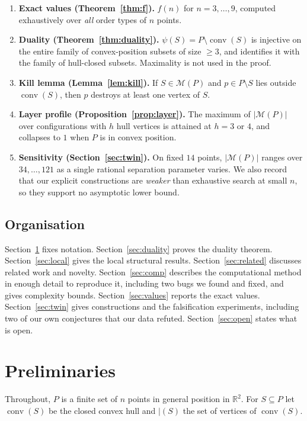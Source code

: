 \documentclass[11pt,a4paper]{article}
\theoremstyle{definition}
\newcommand{\conv}{\operatorname{conv}}
\newcommand{\M}{\mathcal{M}}
\begin{document}
\begin{enumerate}[leftmargin=*]
\item \textbf{Exact values (Theorem~\ref{thm:f}).} $f(n)$ for $n=3,\dots,9$,
  computed exhaustively over \emph{all} order types of $n$ points.
\item \textbf{Duality (Theorem~\ref{thm:duality}).} $\psi(S)=P\setminus\conv(S)$
  is injective on the entire family of convex-position subsets of size $\ge 3$,
  and identifies it with the family of hull-closed subsets.  Maximality is not
  used in the proof.
\item \textbf{Kill lemma (Lemma~\ref{lem:kill}).} If $S\in\M(P)$ and
  $p\in P\setminus S$ lies outside $\conv(S)$, then $p$ destroys at least one
  vertex of $S$.
\item \textbf{Layer profile (Proposition~\ref{prop:layer}).} The maximum of
  $|\M(P)|$ over configurations with $h$ hull vertices is attained at $h=3$ or
  $4$, and collapses to $1$ when $P$ is in convex position.
\item \textbf{Sensitivity (Section~\ref{sec:twin}).} On fixed $14$ points,
  $|\M(P)|$ ranges over $34,\dots,121$ as a single rational separation parameter
  varies.  We also record that our explicit constructions are \emph{weaker} than
  exhaustive search at small $n$, so they support no asymptotic lower bound.
\end{enumerate}

\subsection{Organisation}

Section~\ref{sec:prelim} fixes notation.  Section~\ref{sec:duality} proves the
duality theorem.  Section~\ref{sec:local} gives the local structural results.
Section~\ref{sec:related} discusses related work and novelty.  Section~\ref{sec:comp}
describes the computational method in enough detail to reproduce it, including two
bugs we found and fixed, and gives complexity bounds.  Section~\ref{sec:values}
reports the exact values.  Section~\ref{sec:twin} gives constructions and the
falsification experiments, including two of our own conjectures that our data
refuted.  Section~\ref{sec:open} states what is open.

\section{Preliminaries}
\label{sec:prelim}

Throughout, $P$ is a finite set of $n$ points in general position in
$\mathbb{R}^2$.  For $S\subseteq P$ let $\conv(S)$ be the closed convex hull and
$\vert(S)$ the set of vertices of $\conv(S)$.
\end{document}
